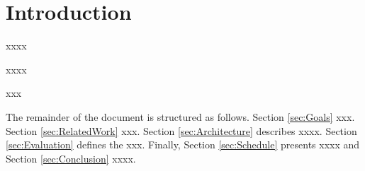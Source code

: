 \section{Introduction}\label{sec:Introduction}

xxxx

\cite{Armbrust:10}

xxxx

xxx




The remainder of the document is structured as follows. Section \ref{sec:Goals} xxx. Section \ref{sec:RelatedWork} xxx. Section \ref{sec:Architecture} describes xxxx. Section \ref{sec:Evaluation} defines the xxx. Finally, Section \ref{sec:Schedule} presents xxxx and Section \ref{sec:Conclusion} xxxx.


